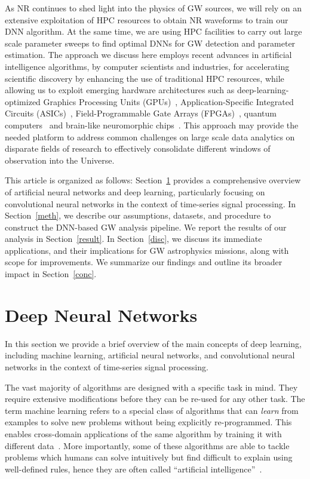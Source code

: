 \documentclass[aps,prd,%
amsmath,floats,floatfix, twocolumn, superscriptaddress,nofootinbib,showpacs]{revtex4-1}
\begin{document}
As NR continues to shed light into the physics of GW sources\cite{NRI:2016}, we will rely on an extensive exploitation of HPC resources to obtain NR waveforms to train our DNN algorithm. At the same time, we are using HPC facilities to carry out large scale parameter sweeps to find optimal DNNs for GW detection and parameter estimation. The approach we discuss here employs recent advances in artificial intelligence algorithms, by computer scientists and industries, for accelerating scientific discovery by enhancing the use of traditional HPC resources, while allowing us to exploit emerging hardware architectures such as deep-learning-optimized Graphics Processing Units (GPUs)~\cite{cuDNN}, Application-Specific Integrated Circuits (ASICs)~\cite{TensorFlow}, Field-Programmable Gate Arrays (FPGAs)~\cite{FPGA}, quantum computers~\cite{quantum} and brain-like neuromorphic chips~\cite{TrueNorth-Science}. This approach may provide the needed platform to address common challenges on large scale data analytics on disparate fields of research to effectively consolidate different windows of observation into the Universe.

This article is organized as follows: Section~\ref{dnn} provides a comprehensive overview of artificial neural networks and deep learning, particularly focusing on convolutional neural networks in the context of time-series signal processing. In Section~\ref{meth}, we describe our assumptions, datasets, and procedure to construct the DNN-based GW analysis pipeline. We report the results of our analysis in Section~\ref{result}. In Section~\ref{disc}, we discuss its immediate applications, and their implications for GW astrophysics missions, along with scope for improvements. We summarize our findings and outline its broader impact in Section~\ref{conc}.


\section{Deep Neural Networks}
\label{dnn}

In this section we provide a brief overview of the main concepts of deep learning, including machine learning, artificial neural networks, and convolutional neural networks in the context of time-series signal processing.

The vast majority of algorithms are designed with a specific task in mind. They require extensive modifications before they can be re-used for any other task. The term machine learning refers to a special class of algorithms that can \textit{learn} from examples to solve new problems without being explicitly re-programmed. This enables cross-domain applications of the same algorithm by training it with different data~\cite{DL-Book}. More importantly, some of these algorithms are able to tackle problems which humans can solve intuitively but find difficult to explain using well-defined rules, hence they are often called ``artificial intelligence''~\cite{DL-Book}.
\end{document}
